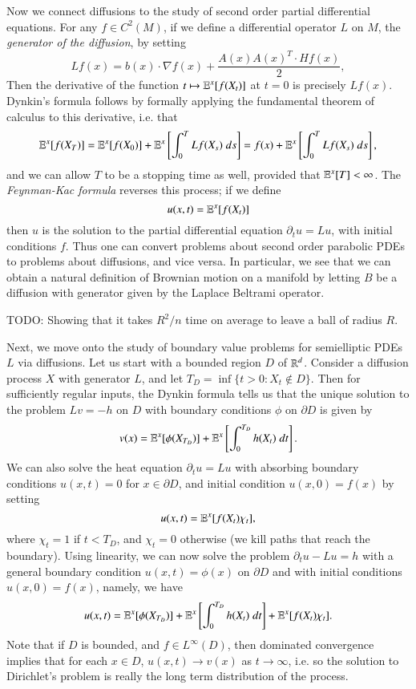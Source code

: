 Now we connect diffusions to the study of second order partial differential equations. For any $f \in C^2(M)$, if we define a differential operator $L$ on $M$, the \emph{generator of the diffusion}, by setting
%
\[ Lf(x) = b(x) \cdot \nabla f(x) + \frac{A(x)A(x)^T \cdot Hf(x)}{2}, \]
%
Then the derivative of the function $t \mapsto \operatorname{\mathbb{E}}^x[f(X_t)]$ at $t = 0$ is precisely $Lf(x)$. Dynkin's formula follows by formally applying the fundamental theorem of calculus to this derivative, i.e. that
%
\[ \operatorname{\mathbb{E}}^x[f(X_T)] = \operatorname{\mathbb{E}}^x[f(X_0)] + \operatorname{\mathbb{E}}^x \left[ \int_0^T Lf(X_s)\; ds \right] = f(x) + \operatorname{\mathbb{E}}^x \left[ \int_0^T Lf(X_s)\; ds \right], \]
%
and we can allow $T$ to be a stopping time as well, provided that $\operatorname{\mathbb{E}}^x[T] < \infty$. The \emph{Feynman-Kac formula} reverses this process; if we define
%
\[ u(x,t) = \operatorname{\mathbb{E}}^x[f(X_t)] \]
%
then $u$ is the solution to the partial differential equation $\partial_t u = Lu$, with initial conditions $f$. Thus one can convert problems about second order parabolic PDEs to problems about diffusions, and vice versa. In particular, we see that we can obtain a natural definition of Brownian motion on a manifold by letting $B$ be a diffusion with generator given by the Laplace Beltrami operator.

TODO: Showing that it takes $R^2/n$ time on average to leave a ball of radius $R$.

Next, we move onto the study of boundary value problems for semielliptic PDEs $L$ via diffusions. Let us start with a bounded region $D$ of $\operatorname{\mathbb{R}}^d$. Consider a diffusion process $X$ with generator $L$, and let $T_D = \inf \{ t > 0 : X_t \not \in D \}$. Then for sufficiently regular inputs, the Dynkin formula tells us that the unique solution to the problem $Lv = -h$ on $D$ with boundary conditions $\phi$ on $\partial D$ is given by
%
\[ v(x) = \operatorname{\mathbb{E}}^x[\phi(X_{T_D})] + \operatorname{\mathbb{E}}^x \left[ \int_0^{T_D} h(X_t)\; dt \right]. \]
%
We can also solve the heat equation $\partial_t u = Lu$ with absorbing boundary conditions $u(x,t) = 0$ for $x \in \partial D$, and initial condition $u(x,0) = f(x)$ by setting
%
\[ u(x,t) = \operatorname{\mathbb{E}}^x[f(X_t) \chi_t ], \]
%
where $\chi_t = 1$ if $t < T_D$, and $\chi_t = 0$ otherwise (we kill paths that reach the boundary). Using linearity, we can now solve the problem $\partial_t u - Lu = h$ with a general boundary condition $u(x,t) = \phi(x)$ on $\partial D$ and with initial conditions $u(x,0) = f(x)$, namely, we have
%
\[ u(x,t) = \operatorname{\mathbb{E}}^x[\phi(X_{T_D})] + \operatorname{\mathbb{E}}^x \left[ \int_0^{T_D} h(X_t)\; dt \right] + \operatorname{\mathbb{E}}^x[f(X_t) \chi_t]. \]
%
Note that if $D$ is bounded, and $f \in L^\infty(D)$, then dominated convergence implies that for each $x \in D$, $u(x,t) \to v(x)$ as $t \to \infty$, i.e. so the solution to Dirichlet's problem is really the long term distribution of the process.



